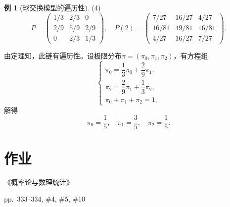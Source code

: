 \documentclass[11pt,a4paper]{report}
\theoremstyle{definition}
\newtheorem{example}{例}[chapter]
\begin{document}
\begin{example}[球交换模型的遍历性]
(4)
\[
P=
\begin{pmatrix}
1/3 & 2/3 & 0\\
2/9 & 5/9 & 2/9\\
0 & 2/3 & 1/3
\end{pmatrix},
\quad
P(2)=
\begin{pmatrix}
7/27 & 16/27 & 4/27\\
16/81 & 49/81 & 16/81\\
4/27 & 16/27 & 7/27
\end{pmatrix}.
\]

由定理知，此链有遍历性。设极限分布$\pi=(\pi_0,\pi_1,\pi_2)$，有方程组
\[
\begin{cases}
\pi_0=\dfrac{1}{3}\pi_0+\dfrac{2}{9}\pi_1,\\[0.5em]
\pi_2=\dfrac{2}{9}\pi_1+\dfrac{1}{3}\pi_2,\\[0.5em]
\pi_0+\pi_1+\pi_2=1,
\end{cases}
\]
解得
\[
\pi_0=\frac{1}{5},\quad\pi_1=\frac{3}{5},\quad\pi_2=\frac{1}{5}.
\]
\end{example}

\section*{作业}

《概率论与数理统计》

pp.~333--334, \#4, \#5, \#10
\end{document}
